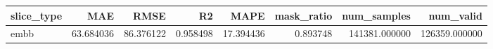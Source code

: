 \begin{tabular}{lrrrrrrr}
\toprule
slice_type & MAE & RMSE & R2 & MAPE & mask_ratio & num_samples & num_valid \\
\midrule
embb & 63.684036 & 86.376122 & 0.958498 & 17.394436 & 0.893748 & 141381.000000 & 126359.000000 \\
\bottomrule
\end{tabular}
